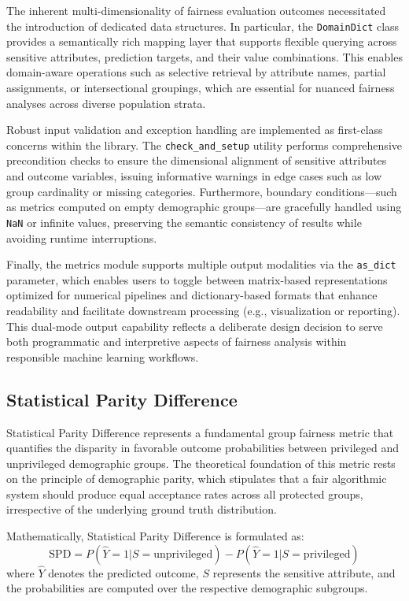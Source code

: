 \documentclass[12pt,a4paper,openright,twoside]{book}
\begin{document}
The inherent multi-dimensionality of fairness evaluation outcomes necessitated the introduction of dedicated data structures. In particular, the \texttt{DomainDict} class provides a semantically rich mapping layer that supports flexible querying across sensitive attributes, prediction targets, and their value combinations. This enables domain-aware operations such as selective retrieval by attribute names, partial assignments, or intersectional groupings, which are essential for nuanced fairness analyses across diverse population strata.

Robust input validation and exception handling are implemented as first-class concerns within the library. The \texttt{check\_and\_setup} utility performs comprehensive precondition checks to ensure the dimensional alignment of sensitive attributes and outcome variables, issuing informative warnings in edge cases such as low group cardinality or missing categories. Furthermore, boundary conditions—such as metrics computed on empty demographic groups—are gracefully handled using \texttt{NaN} or infinite values, preserving the semantic consistency of results while avoiding runtime interruptions.

Finally, the metrics module supports multiple output modalities via the \texttt{as\_dict} parameter, which enables users to toggle between matrix-based representations optimized for numerical pipelines and dictionary-based formats that enhance readability and facilitate downstream processing (e.g., visualization or reporting). This dual-mode output capability reflects a deliberate design decision to serve both programmatic and interpretive aspects of fairness analysis within responsible machine learning workflows.


\subsection{Statistical Parity Difference}

Statistical Parity Difference represents a fundamental group fairness metric that quantifies the disparity in favorable outcome probabilities between privileged and unprivileged demographic groups. The theoretical foundation of this metric rests on the principle of demographic parity, which stipulates that a fair algorithmic system should produce equal acceptance rates across all protected groups, irrespective of the underlying ground truth distribution.

Mathematically, Statistical Parity Difference is formulated as:
\begin{equation}
\text{SPD} = P(\hat{Y}=1|S=\text{unprivileged}) - P(\hat{Y}=1|S=\text{privileged})
\end{equation}
where $\hat{Y}$ denotes the predicted outcome, $S$ represents the sensitive attribute, and the probabilities are computed over the respective demographic subgroups.
\end{document}
